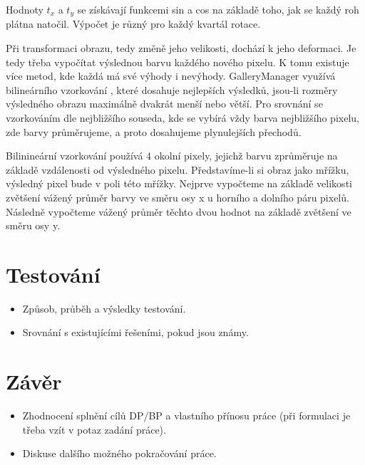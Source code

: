 \documentclass[11pt,twoside,a4paper]{book}
\begin{document}
\indent
Hodnoty $t_{x}$ a $t_{y}$ se získávají funkcemi sin a cos na základě toho, jak se každý roh plátna natočil. Výpočet je různý pro každý kvartál rotace.

\indent 
Při transformaci obrazu, tedy změně jeho velikosti, dochází k jeho deformaci. Je tedy třeba vypočítat výslednou barvu každého nového pixelu. K tomu existuje více metod, kde každá má své výhody i nevýhody. GalleryManager využívá bilineárního vzorkování \cite{wiki:bilinear}, které dosahuje nejlepších výsledků, jsou-li rozměry výsledného obrazu maximálně dvakrát menší nebo větší. Pro srovnání se vzorkováním dle nejbližšího souseda, kde se vybírá vždy barva nejbližšího pixelu, zde barvy průměrujeme, a proto dosahujeme plynulejších přechodů.

\indent
Bilinineární vzorkování používá 4 okolní pixely, jejichž barvu zprůměruje na základě vzdálenosti od výsledného pixelu. Představíme-li si obraz jako mřížku, výsledný pixel bude v poli této mřížky. Nejprve vypočteme na základě velikosti zvětšení vážený průměr barvy ve směru osy x u horního a dolního páru pixelů. Následně vypočteme vážený průměr těchto dvou hodnot na základě zvětšení ve směru osy y.





\chapter{Testování}

\begin{itemize}
 \item Způsob, průběh a výsledky testování.
 \item Srovnání s existujícími řešeními, pokud jsou známy.
\end{itemize} 


\chapter{Závěr}

\begin{itemize}
\item Zhodnocení splnění cílů DP/BP a  vlastního přínosu práce (při formulaci je třeba vzít v potaz zadání práce).
\item Diskuse dalšího možného pokračování práce.
\end{itemize} 
\end{document}
